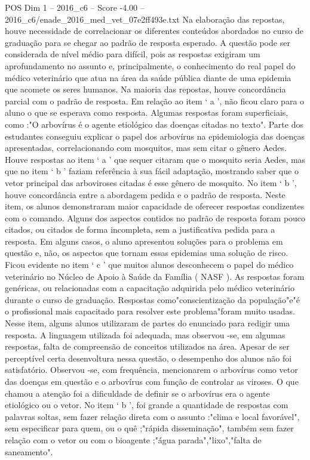 \begin{textsample}{POS Dim 1 – 2016\_c6 – Score -4.00 – 2016\_c6/enade\_2016\_med\_vet\_07e2ff493e.txt}
Na elaboração das repostas, houve necessidade de correlacionar os diferentes conteúdos abordados no curso de graduação para se chegar ao padrão de resposta esperado.
A questão pode ser considerada de nível médio para difícil, pois as respostas exigiram um aprofundamento no assunto e, principalmente, o conhecimento do real papel do médico veterinário que atua na área da saúde pública diante de uma epidemia que acomete os seres humanos.
Na maioria das repostas, houve concordância parcial com o padrão de resposta.
Em relação ao item ‘ a ’, não ficou claro para o aluno o que se esperava como resposta.
Algumas respostas foram superficiais, como :"O arbovírus é o agente etiológico das doenças citadas no texto".
Parte dos estudantes conseguiu explicar o papel dos arbovírus na epidemiologia das doenças apresentadas, correlacionando com mosquitos, mas sem citar o gênero Aedes.
Houve respostas ao item ‘ a ’ que sequer citaram que o mosquito seria Aedes, mas que no item ‘ b ’ faziam referência à sua fácil adaptação, mostrando saber que o vetor principal das arboviroses citadas é esse gênero de mosquito.
No item ‘ b ’, houve concordância entre a abordagem pedida e o padrão de resposta.
Neste item, os alunos demonstraram maior capacidade de oferecer respostas condizentes com o comando.
Alguns dos aspectos contidos no padrão de resposta foram pouco citados, ou citados de forma incompleta, sem a justificativa pedida para a resposta.
Em alguns casos, o aluno apresentou soluções para o problema em questão e, não, os aspectos que tornam essas epidemias uma solução de risco.
Ficou evidente no item ‘ c ’ que muitos alunos desconhecem o papel do médico veterinário no Núcleo de Apoio à Saúde da Família ( NASF ).
As respostas foram genéricas, ou relacionadas com a capacitação adquirida pelo médico veterinário durante o curso de graduação.
Respostas como"conscientização da população"e"é o profissional mais capacitado para resolver este problema"foram muito usadas.
Nesse item, alguns alunos utilizaram de partes do enunciado para redigir uma resposta.
A linguagem utilizada foi adequada, mas observou -se, em algumas respostas, falta de compreensão de conceitos utilizados na área.
Apesar de ser perceptível certa desenvoltura nessa questão, o desempenho dos alunos não foi satisfatório.
Observou -se, com frequência, mencionarem o arbovírus como vetor das doenças em questão e o arbovírus com função de controlar as viroses.
O que chamou a atenção foi a dificuldade de definir se o arbovírus era o agente etiológico ou o vetor.
No item ‘ b ’, foi grande a quantidade de respostas com palavras soltas, sem fazer relação direta com o assunto :"clima e local favorável", sem especificar para quem, ou o quê ;"rápida disseminação", também sem fazer relação com o vetor ou com o bioagente ;"água parada","lixo","falta de saneamento".

\end{textsample}
